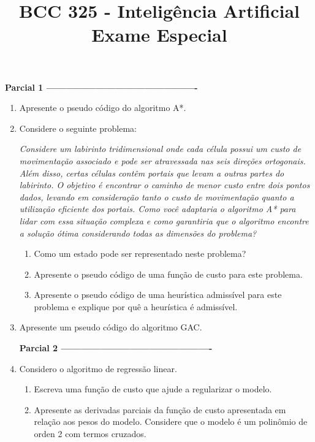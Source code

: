 \documentclass{article}
\title{\vspace{-2 cm} BCC 325 - Inteligência Artificial \\ Exame Especial}
\date{}
\begin{document}
\maketitle

\vspace{-1 cm}

\textbf{Parcial 1 ----------------------------------------------}

\begin{enumerate}

    \item Apresente o pseudo código do algoritmo A*.  
    
    \item Considere o seguinte problema:
    
    \textit{Considere um labirinto tridimensional onde cada célula possui um custo de movimentação associado e pode ser atravessada nas seis direções ortogonais. Além disso, certas células contêm portais que levam a outras partes do labirinto. O objetivo é encontrar o caminho de menor custo entre dois pontos dados, levando em consideração tanto o custo de movimentação quanto a utilização eficiente dos portais. Como você adaptaria o algoritmo A* para lidar com essa situação complexa e como garantiria que o algoritmo encontre a solução ótima considerando todas as dimensões do problema?}

    \begin{enumerate}
        \item Como um estado pode ser representado neste problema?
        \item Apresente o pseudo código de uma função de custo para este problema. 
        \item Apresente o pseudo código de uma heurística admissível para este problema e explique por quê a heurística é admissível.
    \end{enumerate}
    
    \item Apresente um pseudo código do algoritmo GAC.   

\textbf{Parcial 2 ----------------------------------------------}

    \item  Considero o algoritmo de regressão linear. 
    \begin{enumerate}
        \item Escreva uma função de custo que ajude a regularizar o modelo.
        \item Apresente as derivadas parciais da função de custo apresentada em relação aos pesos do modelo. Considere que o modelo é um polinômio de orden 2 com termos cruzados.
    \end{enumerate}


\end{enumerate}
\end{document}
